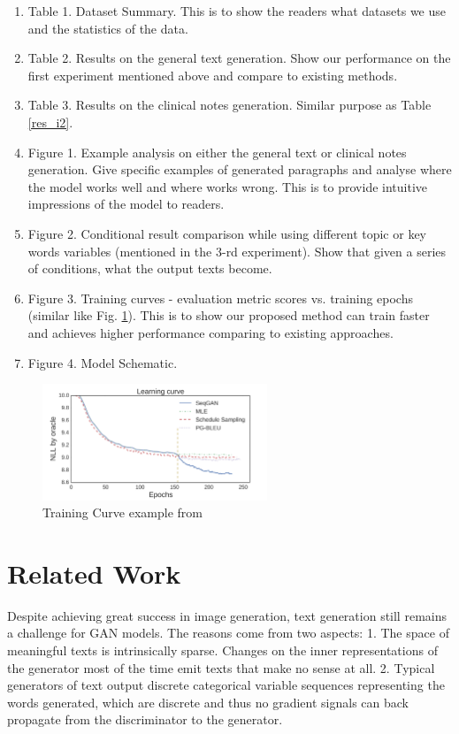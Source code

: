 \documentclass[12pt]{report}
\begin{document}
\begin{enumerate}
    \item Table 1. Dataset Summary. This is to show the readers what datasets we use and the statistics of the data.
    \item Table 2. Results on the general text generation. Show our performance on the first experiment mentioned above and compare to existing methods. \label{res_i2}
    \item Table 3. Results on the clinical notes generation. Similar purpose as Table \ref{res_i2}.
    \item Figure 1. Example analysis on either the general text or clinical notes generation. Give specific examples of generated paragraphs and analyse where the model works well and where works wrong. This is to provide intuitive impressions of the model to readers.
    \item Figure 2. Conditional result comparison while using different topic or key words variables (mentioned in the 3-rd experiment). Show that given a series of conditions, what the output texts become. 
    \item Figure 3. Training curves - evaluation metric scores vs. training epochs (similar like Fig. \ref{fg:eg}). This is to show our proposed method can train faster and achieves higher performance comparing to existing approaches.
    \item Figure 4. Model Schematic.
\end{enumerate}

\begin{figure}[H]
    \centering 
    \includegraphics[width=0.6\textwidth]{Image/TrainingCurve.png} 
    \caption{Training Curve example from \cite{yu2017seqgan}}
    \label{fg:eg}
\end{figure}

\section*{Related Work}
Despite achieving great success in image generation, text generation still remains a challenge for GAN models. The reasons come from two aspects: 1. The space of meaningful texts is intrinsically sparse. Changes on the inner representations of the generator most of the time emit texts that make no sense at all. 2. Typical generators of text output discrete categorical variable sequences representing the words generated, which are discrete and thus no gradient signals can back propagate from the discriminator to the generator.
\end{document}
